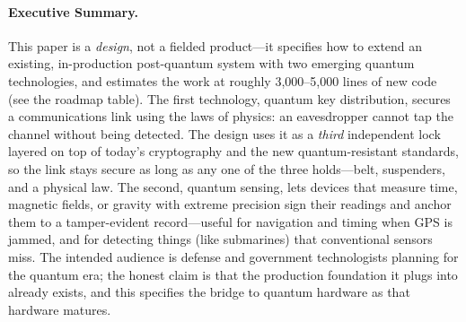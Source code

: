 \documentclass[11pt,letterpaper]{article}
\begin{document}
\makecover

\begin{abstract}
We present an architecture for integrating quantum key distribution (QKD) hardware and quantum sensing devices into a production post-quantum blockchain stack. The system extends five existing production components---QuantumVM (Q-Chain), the KEM cryptographic interface, RNS mesh transport, Sovereign KMS, and the Hanzo Zero Trust fabric---with QKD-derived key material and quantum sensor attestations. A novel \emph{triple-hybrid} key derivation combines classical Diffie-Hellman (X25519), post-quantum lattice encapsulation (ML-KEM-768, ), and physics-layer QKD shared secrets via HKDF, ensuring link security if \emph{any one} of three independent foundations holds: elliptic curve hardness, Module-LWE hardness, or the laws of quantum mechanics. Quantum sensors---atomic clocks, magnetometers, and gravimeters---feed cryptographically attested measurements into the Q-Chain via a Sensor Oracle, stamped with dual BLS/Corona threshold signatures for immutable provenance. We specify ETSI GS QKD 014 and ITU-T Y.3800 compliant interfaces, analyze integration with threshold MPC signing ceremonies, and project a 3,000--5,000 line implementation leveraging existing production interfaces. No competing blockchain system offers production post-quantum consensus, let alone QKD or quantum sensing integration.
\end{abstract}

\paragraph{Executive Summary.}
This paper is a \emph{design}, not a fielded product---it specifies how to extend an existing, in-production post-quantum system with two emerging quantum technologies, and estimates the work at roughly 3,000--5,000 lines of new code (see the roadmap table). The first technology, quantum key distribution, secures a communications link using the laws of physics: an eavesdropper cannot tap the channel without being detected. The design uses it as a \emph{third} independent lock layered on top of today's cryptography and the new quantum-resistant standards, so the link stays secure as long as any one of the three holds---belt, suspenders, and a physical law. The second, quantum sensing, lets devices that measure time, magnetic fields, or gravity with extreme precision sign their readings and anchor them to a tamper-evident record---useful for navigation and timing when GPS is jammed, and for detecting things (like submarines) that conventional sensors miss. The intended audience is defense and government technologists planning for the quantum era; the honest claim is that the production foundation it plugs into already exists, and this specifies the bridge to quantum hardware as that hardware matures.
\end{document}
